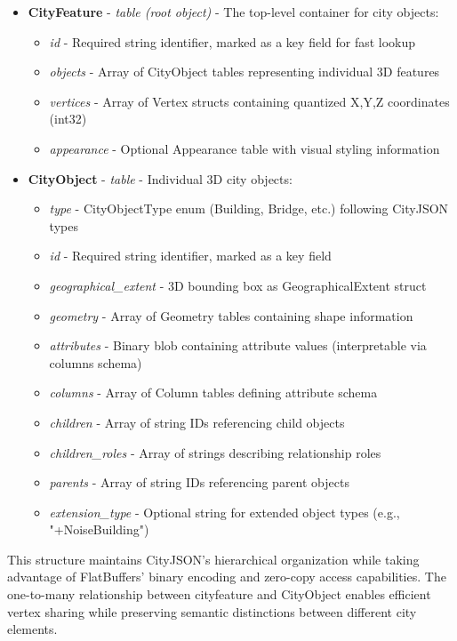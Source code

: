 \begin{itemize}
  \item \textbf{CityFeature} - \textit{table (root object)} - The top-level container for city objects:
    \begin{itemize}
      \item \textit{id} - Required string identifier, marked as a key field for fast lookup
      \item \textit{objects} - Array of CityObject tables representing individual 3D features
      \item \textit{vertices} - Array of Vertex structs containing quantized X,Y,Z coordinates (int32)
      \item \textit{appearance} - Optional Appearance table with visual styling information
    \end{itemize}

  \item \textbf{CityObject} - \textit{table} - Individual 3D city objects:
    \begin{itemize}
      \item \textit{type} - CityObjectType enum (Building, Bridge, etc.) following CityJSON types \citep{cityjson_spec}
      \item \textit{id} - Required string identifier, marked as a key field
      \item \textit{geographical\_extent} - 3D bounding box as GeographicalExtent struct
      \item \textit{geometry} - Array of Geometry tables containing shape information
      \item \textit{attributes} - Binary blob containing attribute values (interpretable via columns schema)
      \item \textit{columns} - Array of Column tables defining attribute schema
      \item \textit{children} - Array of string IDs referencing child objects
      \item \textit{children\_roles} - Array of strings describing relationship roles
      \item \textit{parents} - Array of string IDs referencing parent objects
      \item \textit{extension\_type} - Optional string for extended object types (e.g., "+NoiseBuilding")
    \end{itemize}
\end{itemize}

This structure maintains CityJSON's hierarchical organization while taking advantage of FlatBuffers' binary encoding and zero-copy access capabilities. The one-to-many relationship between \ac{cityfeature} and CityObject enables efficient vertex sharing while preserving semantic distinctions between different city elements.

